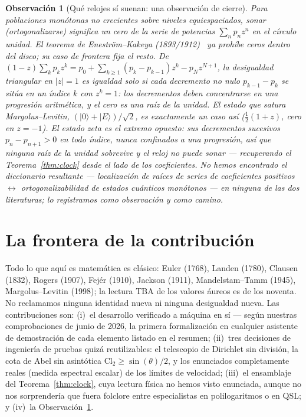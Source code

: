 \documentclass[11pt]{article}
\newtheorem{remark}{Observación}
\newcommand{\Cl}{\mathrm{Cl}_2}
\begin{document}
\begin{remark}[Qu\'e relojes s\'i suenan: una observaci\'on de cierre]\label{rem:ek}
Para poblaciones mon\'otonas no crecientes sobre niveles equiespaciados, sonar
(ortogonalizarse) significa un cero de la serie de potencias $\sum_n p_nz^n$ \emph{en}
el c\'irculo unidad. El teorema de Enestr\"om--Kakeya (1893/1912)~\cite{enestrom} ya
proh\'ibe ceros dentro del disco; su caso de frontera fija el resto. De
$(1-z)\sum_k p_kz^k=p_0+\sum_{k\ge1}(p_k-p_{k-1})z^k-p_Nz^{N+1}$, la desigualdad
triangular en $\lvert z\rvert=1$ es igualdad solo si cada decremento no nulo
$p_{k-1}-p_k$ se sit\'ua en un \'indice $k$ con $z^k=1$: los decrementos deben
concentrarse en una progresi\'on aritm\'etica, y el cero es una ra\'iz de la unidad. El
estado que satura Margolus--Levitin, $(\lvert0\rangle+\lvert E\rangle)/\sqrt2$, es
exactamente un caso as\'i ($\frac12(1+z)$, cero en $z=-1$). El estado zeta es el extremo
opuesto: sus decrementos sucesivos $p_n-p_{n+1}>0$ en \emph{todo} \'indice, nunca
confinados a una progresi\'on, as\'i que ninguna ra\'iz de la unidad sobrevive y el reloj
no puede sonar --- recuperando el Teorema~\ref{thm:clock} desde el lado de los
coeficientes. No hemos encontrado el diccionario resultante --- localizaci\'on de
ra\'ices de series de coeficientes positivos $\leftrightarrow$ ortogonalizabilidad de
estados cu\'anticos mon\'otonos --- en ninguna de las dos literaturas; lo registramos
como observaci\'on y como camino.
\end{remark}

\section{La frontera de la contribuci\'on}\label{sec:boundary}

Todo lo que aqu\'i es matem\'atica es cl\'asico: Euler (1768), Landen (1780), Clausen
(1832), Rogers (1907), Fej\'er (1910), Jackson (1911), Mandelstam--Tamm (1945),
Margolus--Levitin (1998); la lectura TBA de los valores \'aureos es de los noventa. No
reclamamos ninguna identidad nueva ni ninguna desigualdad nueva. Las contribuciones son:
(i)~el desarrollo verificado a m\'aquina en s\'i --- seg\'un nuestras comprobaciones de
junio de 2026, la primera formalizaci\'on en cualquier asistente de demostraci\'on de cada
elemento listado en el resumen;
(ii)~tres decisiones de ingenier\'ia de pruebas quiz\'a reutilizables: el telescopio de
Dirichlet sin divisi\'on, la cota de Abel sin asint\'otica $\Cl\ge\sin(\theta)/2$, y los
enunciados completamente reales (medida espectral escalar) de los l\'imites de
velocidad;
(iii)~el ensamblaje del Teorema~\ref{thm:clock}, cuya lectura f\'isica no hemos visto
enunciada, aunque no nos sorprender\'ia que fuera folclore entre especialistas en
polilogaritmos o en QSL; y (iv)~la Observaci\'on~\ref{rem:ek}.
\end{document}
